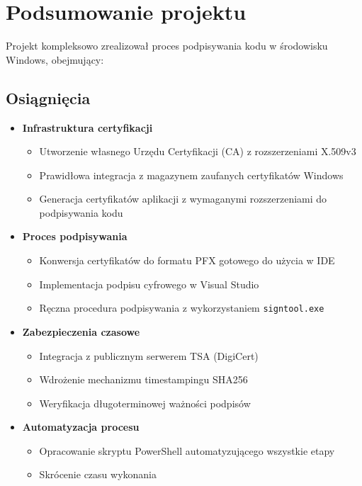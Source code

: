 \documentclass{article}
\begin{document}
\section{Podsumowanie projektu}

\noindent Projekt kompleksowo zrealizował proces podpisywania kodu w środowisku Windows, obejmujący:

\subsection*{Osiągnięcia}
\begin{itemize}
    \item \textbf{Infrastruktura certyfikacji}
    \begin{itemize}
        \item Utworzenie własnego Urzędu Certyfikacji (CA) z rozszerzeniami X.509v3
        \item Prawidłowa integracja z magazynem zaufanych certyfikatów Windows
        \item Generacja certyfikatów aplikacji z wymaganymi rozszerzeniami do podpisywania kodu
    \end{itemize}

    \item \textbf{Proces podpisywania}
    \begin{itemize}
        \item Konwersja certyfikatów do formatu PFX gotowego do użycia w IDE
        \item Implementacja podpisu cyfrowego w Visual Studio
        \item Ręczna procedura podpisywania z wykorzystaniem \texttt{signtool.exe}
    \end{itemize}

    \item \textbf{Zabezpieczenia czasowe}
    \begin{itemize}
        \item Integracja z publicznym serwerem TSA (DigiCert)
        \item Wdrożenie mechanizmu timestampingu SHA256
        \item Weryfikacja długoterminowej ważności podpisów
    \end{itemize}

    \item \textbf{Automatyzacja procesu}
    \begin{itemize}
        \item Opracowanie skryptu PowerShell automatyzującego wszystkie etapy
        \item Skrócenie czasu wykonania
    \end{itemize}
\end{itemize}
\end{document}
